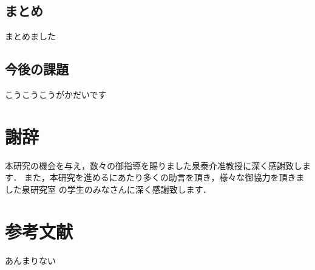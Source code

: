 \documentclass{thesis}
\theoremstyle{definition}
\begin{document}
\section{まとめ}
まとめました
\section{今後の課題}
こうこうこうがかだいです

\chapter*{謝辞}
本研究の機会を与え，数々の御指導を賜りました泉泰介准教授に深く感謝致します．
また，本研究を進めるにあたり多くの助言を頂き，様々な御協力を頂きました泉研究室
の学生のみなさんに深く感謝致します．

\chapter*{参考文献}
あんまりない
\end{document}
